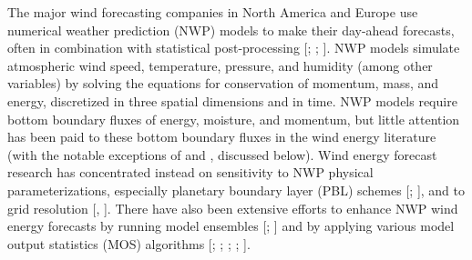 The major wind forecasting companies in North America and Europe use numerical weather prediction (NWP) models to make their day-ahead forecasts, often in combination with statistical post-processing [\cite{porter2010status}; \cite{foley2012current}; \cite{monteiro2009wind}].  NWP models simulate atmospheric wind speed, temperature, pressure, and humidity (among other variables) by solving the equations for conservation of momentum, mass, and energy, discretized in three spatial dimensions and in time.  NWP models require bottom boundary fluxes of energy, moisture, and momentum, but little attention has been paid to these bottom boundary fluxes in the wind energy literature (with the notable exceptions of \cite{marjanovic2014} and \cite{wharton2011review}, discussed below).  Wind energy forecast research has concentrated instead on sensitivity to NWP physical parameterizations, especially planetary boundary layer (PBL) schemes [\cite{draxl2014evaluating}; \cite{marjanovic2014}], and to grid resolution [\cite{marjanovic2014}, \cite{carvalho2012sensitivity}].  There have also been extensive efforts to enhance NWP wind energy forecasts by running model ensembles [\cite{deppe2013wrf}; \cite{pinson2009ensemble}] and by applying various model output statistics (MOS) algorithms [\cite{bedard2013development}; \cite{ranaboldo2013implementation}; \cite{ellis2014predicting}; \cite{ortiz2011short}; \cite{kusiak2009wind}].



